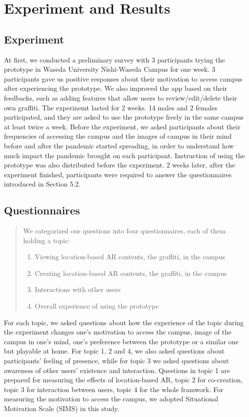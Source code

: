 \chapter{Experiment and Results}\label{ch:5}

\section{Experiment}
At first, we conducted a preliminary survey with 3 participants trying the prototype in Waseda University Nishi-Waseda Campus for one week.
3 participants gave us positive responses about their motivation to access campus after experiencing the prototype.
We also improved the app based on their feedbacks, such as adding features that allow users to review/edit/delete their own graffiti.
The experinemt lasted for 2 weeks. 14 males and 2 females participated,
and they are asked to use the prototype freely in the same campus at least twice a week.
Before the experiment, we asked participants about their frequencies of accessing the campus and the images of campus in their mind before and after the pandemic started spreading,
in order to understand how much impact the pandemic brought on each participant.
Instruction of using the prototype was also distributed before the experiment.
2 weeks later, after the experiment finished, participants were required to answer the questionnaires introduced in Section 5.2.

\section{Questionnaires}

\begin{quote}
  We categorized our questions into four questionnaires, each of them holding a topic:
  \begin{enumerate}
    \item Viewing location-based AR contents, the graffiti, in the campus
    \item Creating location-based AR contents, the graffiti, in the campus
    \item Interactions with other users
    \item Overall experience of using the prototype
  \end{enumerate}
\end{quote}

For each topic, we asked questions about how the experience of the topic during the experiment changes one's motivation to access the campus, image of the campus in one's mind, one's preference between the prototype or a similar one but playable at home.
For topic 1, 2 and 4, we also asked questions about participants' feeling of presence, while for topic 3 we asked questions about awareness of other users' existence and interaction.
Questions in topic 1 are prepared for measuring the effects of location-based AR, topic 2 for co-creation, topic 3 for interaction between users, topic 4 for the whole framwork.
For measuring the motivation to access the campus, we adopted Situational Motivation Scale (SIMS) \cite{guay_vallerand_blanchard_2000} in this study.

